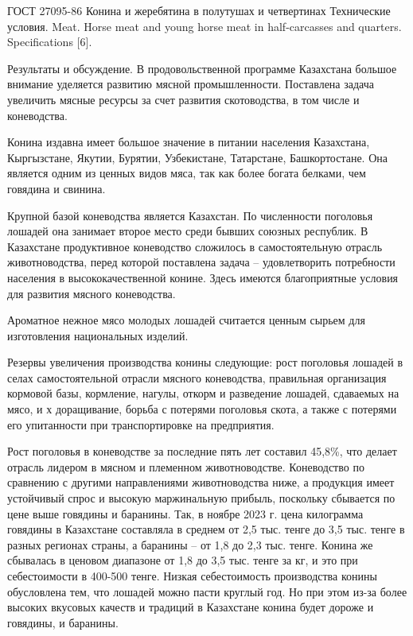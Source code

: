 ГОСТ 27095-86 Конина и жеребятина в полутушах и четвертинах Технические
условия. Meat. Horse meat and young horse meat in half-carcasses and
quarters.~\\
Specifications {[}6{]}.

Результаты и обсуждение. В продовольственной программе Казахстана
большое внимание уделяется развитию мясной промышленности. Поставлена
задача увеличить мясные ресурсы за счет развития скотоводства, в том
числе и коневодства.

Конина издавна имеет большое значение в питании населения Казахстана,
Кыргызстане, Якутии, Бурятии, Узбекистане, Татарстане, Башкортостане.
Она является одним из ценных видов мяса, так как более богата белками,
чем говядина и свинина.

Крупной базой коневодства является Казахстан. По численности поголовья
лошадей она занимает второе место среди бывших союзных республик. В
Казахстане продуктивное коневодство сложилось в самостоятельную отрасль
животноводства, перед которой поставлена задача -- удовлетворить
потребности населения в высококачественной конине. Здесь имеются
благоприятные условия для развития мясного коневодства.

Ароматное нежное мясо молодых лошадей считается ценным сырьем для
изготовления национальных изделий.

Резервы увеличения производства конины следующие: рост поголовья лошадей
в селах самостоятельной отрасли мясного коневодства, правильная
организация кормовой базы, кормление, нагулы, откорм и разведение
лошадей, сдаваемых на мясо, и х доращивание, борьба с потерями поголовья
скота, а также с потерями его упитанности при транспортировке на
предприятия.

Рост поголовья в коневодстве за последние пять лет составил 45,8\%, что
делает отрасль лидером в мясном и племенном животноводстве. Коневодство
по сравнению с другими направлениями животноводства ниже, а продукция
имеет устойчивый спрос и высокую маржинальную прибыль, поскольку
сбывается по цене выше говядины и баранины. Так, в ноябре 2023 г. цена
килограмма говядины в Казахстане составляла в среднем от 2,5 тыс. тенге
до 3,5 тыс. тенге в разных регионах страны, а баранины -- от 1,8 до 2,3
тыс. тенге. Конина же сбывалась в ценовом диапазоне от 1,8 до 3,5 тыс.
тенге за кг, и это при себестоимости в 400-500 тенге. Низкая
себестоимость производства конины обусловлена тем, что лошадей можно
пасти круглый год. Но при этом из-за более высоких вкусовых качеств и
традиций в Казахстане конина будет дороже и говядины, и баранины.

